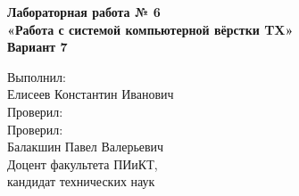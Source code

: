 \pagestyle{fancy}

\vspace*{10cm}
\begin{center}
	\LARGE\textbf
	{Лабораторная работа № 6\\
	«Работа с системой
	компьютерной вёрстки T\raisebox{-0.5ex}{E}X»\\
	Вариант 7}
\end{center}
\vspace*{4cm}
\begin{flushright}
	\Large
	{Выполнил:\\
	Елисеев Константин Иванович\\
	\vspace{1cm}
	Проверил:\\
	Проверил:\\
	Балакшин Павел Валерьевич\\
	Доцент факультета ПИиКТ,\\ кандидат технических наук\\}
\end{flushright}